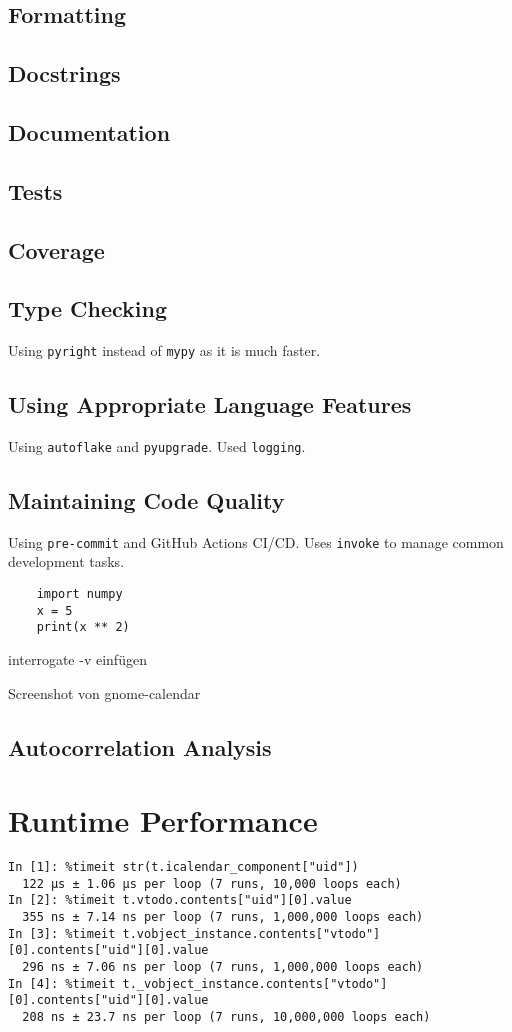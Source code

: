 \documentclass{prettytex/ox/mmsc-special-topic}
\begin{document}
  \subsection{Formatting}
  \subsection{Docstrings}
  \subsection{Documentation}
  \subsection{Tests}
  \subsection{Coverage}
  \subsection{Type Checking}
  Using \texttt{pyright} instead of \texttt{mypy} as it is much faster.
  \subsection{Using Appropriate Language Features}
  Using \texttt{autoflake} and \texttt{pyupgrade}.
  Used \texttt{logging}.
  \subsection{Maintaining Code Quality}
  Using \texttt{pre-commit} and GitHub Actions CI/CD.
  Uses \texttt{invoke} to manage common development tasks.

  \begin{verbatim}
    import numpy
    x = 5
    print(x ** 2)
  \end{verbatim}

  interrogate -v einfügen

  Screenshot von gnome-calendar

  \subsection{Autocorrelation Analysis}

  \section{Runtime Performance}
  \begin{verbatim}
In [1]: %timeit str(t.icalendar_component["uid"])
  122 µs ± 1.06 µs per loop (7 runs, 10,000 loops each)
In [2]: %timeit t.vtodo.contents["uid"][0].value
  355 ns ± 7.14 ns per loop (7 runs, 1,000,000 loops each)
In [3]: %timeit t.vobject_instance.contents["vtodo"][0].contents["uid"][0].value
  296 ns ± 7.06 ns per loop (7 runs, 1,000,000 loops each)
In [4]: %timeit t._vobject_instance.contents["vtodo"][0].contents["uid"][0].value
  208 ns ± 23.7 ns per loop (7 runs, 10,000,000 loops each)
  \end{verbatim}
\end{document}
